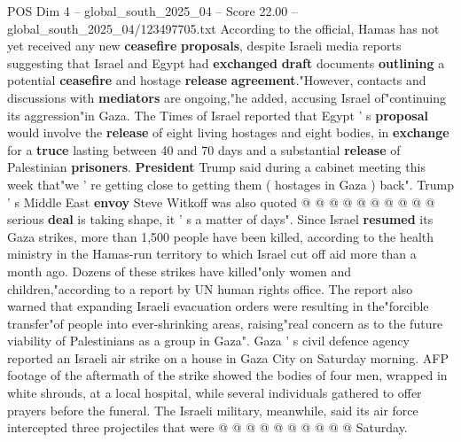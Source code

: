 \begin{textsample}{POS Dim 4 – global\_south\_2025\_04 – Score 22.00 – global\_south\_2025\_04/123497705.txt}
According to the official, Hamas has not yet received any new \textbf{ceasefire} \textbf{proposals}, despite Israeli media reports suggesting that Israel and Egypt had \textbf{exchanged} \textbf{draft} documents \textbf{outlining} a potential \textbf{ceasefire} and hostage \textbf{release} \textbf{agreement}."However, contacts and discussions with \textbf{mediators} are ongoing,"he added, accusing Israel of"continuing its aggression"in Gaza.
The Times of Israel reported that Egypt ' s \textbf{proposal} would involve the \textbf{release} of eight living hostages and eight bodies, in \textbf{exchange} for a \textbf{truce} lasting between 40 and 70 days and a substantial \textbf{release} of Palestinian \textbf{prisoners}. \textbf{President} Trump said during a cabinet meeting this week that"we ' re getting close to getting them ( hostages in Gaza ) back".
Trump ' s Middle East \textbf{envoy} Steve Witkoff was also quoted @ @ @ @ @ @ @ @ @ @ serious \textbf{deal} is taking shape, it ' s a matter of days".
Since Israel \textbf{resumed} its Gaza strikes, more than 1,500 people have been killed, according to the health ministry in the Hamas-run territory to which Israel cut off aid more than a month ago.
Dozens of these strikes have killed"only women and children,"according to a report by UN human rights office.
The report also warned that expanding Israeli evacuation orders were resulting in the"forcible transfer"of people into ever-shrinking areas, raising"real concern as to the future viability of Palestinians as a group in Gaza".
Gaza ' s civil defence agency reported an Israeli air strike on a house in Gaza City on Saturday morning.
AFP footage of the aftermath of the strike showed the bodies of four men, wrapped in white shrouds, at a local hospital, while several individuals gathered to offer prayers before the funeral.
The Israeli military, meanwhile, said its air force intercepted three projectiles that were @ @ @ @ @ @ @ @ @ @ Saturday.

\end{textsample}
